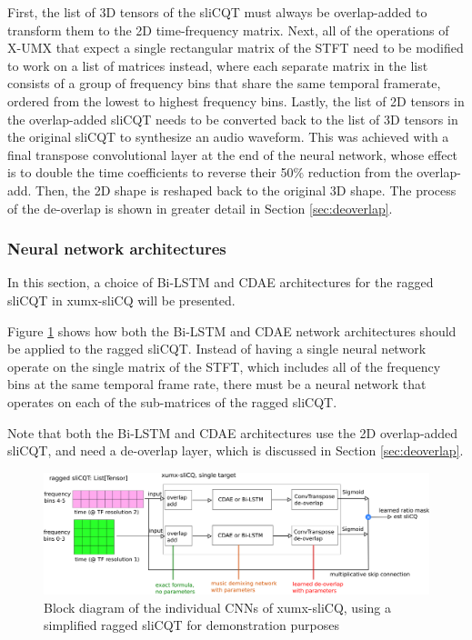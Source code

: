 \documentclass[report.tex]{subfiles}
\begin{document}
First, the list of 3D tensors of the sliCQT must always be overlap-added to transform them to the 2D time-frequency matrix. Next, all of the operations of X-UMX that expect a single rectangular matrix of the STFT need to be modified to work on a list of matrices instead, where each separate matrix in the list consists of a group of frequency bins that share the same temporal framerate, ordered from the lowest to highest frequency bins. Lastly, the list of 2D tensors in the overlap-added sliCQT needs to be converted back to the list of 3D tensors in the original sliCQT to synthesize an audio waveform. This was achieved with a final transpose convolutional layer at the end of the neural network, whose effect is to double the time coefficients to reverse their 50\% reduction from the overlap-add. Then, the 2D shape is reshaped back to the original 3D shape. The process of the de-overlap is shown in greater detail in Section \ref{sec:deoverlap}.

\subsubsection{Neural network architectures}
\label{sec:slicqarches}

In this section, a choice of Bi-LSTM and CDAE architectures for the ragged sliCQT in xumx-sliCQ will be presented.


Figure \ref{fig:cdaeslicqt} shows how both the Bi-LSTM and CDAE network architectures should be applied to the ragged sliCQT. Instead of having a single neural network operate on the single matrix of the STFT, which includes all of the frequency bins at the same temporal frame rate, there must be a neural network that operates on each of the sub-matrices of the ragged sliCQT.

Note that both the Bi-LSTM and CDAE architectures use the 2D overlap-added sliCQT, and need a de-overlap layer, which is discussed in Section \ref{sec:deoverlap}.

\begin{figure}[ht]
	\centering
	\includegraphics[width=\textwidth]{./images-blockdiagrams/xumx_slicq_pertarget_cdae_bilstm.png}
	\caption{Block diagram of the individual CNNs of xumx-sliCQ, using a simplified ragged sliCQT for demonstration purposes}
	\label{fig:cdaeslicqt}
\end{figure}
\end{document}
